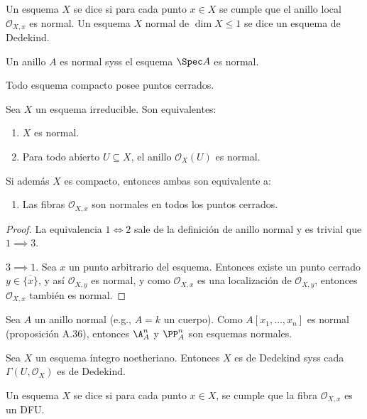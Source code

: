 \begin{mydef}
	Un esquema $X$ se dice  si para cada punto $x \in X$
	se cumple que el anillo local $\mathscr{O}_{X, x}$ es normal.
	Un esquema $X$ normal de $\dim X \le 1$
	se dice un esquema de Dedekind.
\end{mydef}
\begin{cor}
	Un anillo $A$ es normal syss el esquema $\Spec A$ es normal.
\end{cor}
\begin{prop}
	Todo esquema compacto posee puntos cerrados.
\end{prop}
\begin{prop}
	Sea $X$ un esquema irreducible. Son equivalentes:
	\begin{enumerate}
		\item $X$ es normal.
		\item Para todo abierto $U \subseteq X$, el anillo $\mathscr{O}_X(U)$ es normal.
	\end{enumerate}
	Si además $X$ es compacto, entonces ambas son equivalente a:
	\begin{enumerate}[resume]
		\item Las fibras $\mathscr{O}_{X,x}$ son normales en todos los puntos cerrados.
	\end{enumerate}
\end{prop}
\begin{proof}
	La equivalencia $1 \iff 2$ sale de la definición de anillo
	normal y es trivial que $1 \implies 3$.

	$3 \implies 1$. Sea $x$ un punto arbitrario del esquema. Entonces existe un
	punto cerrado $y \in \overline{\{ x \}}$, y así $\mathscr{O}_{X, y}$ es normal, y como $\mathscr{O}_{X, x}$ es una localización
	de $\mathscr{O}_{X, y}$, entonces $\mathscr{O}_{X, x}$ también es normal.
\end{proof}
\begin{ex}
	Sea $A$ un anillo normal (e.g., $A = k$ un cuerpo).
	Como $A[x_1, \dots, x_n]$ es normal (proposición A.36), entonces $\A^n_A$ y $\PP^n_A$ son esquemas normales.
\end{ex}
\begin{cor}
	Sea $X$ un esquema íntegro noetheriano. Entonces $X$ es
	de Dedekind syss cada $\Gamma(U, \mathscr{O}_X)$ es de Dedekind.
\end{cor}
\begin{mydef}
	Un esquema $X$ se dice  si para cada punto
	$x \in X$, se cumple que la fibra $\mathscr{O}_{X, x}$ es un DFU.
\end{mydef}


